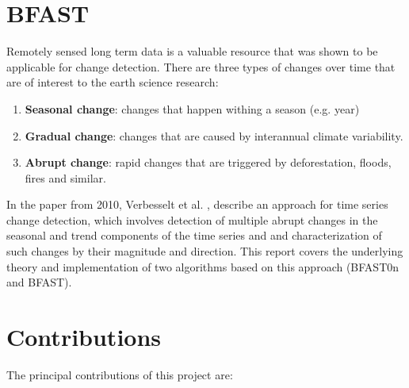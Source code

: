 \documentclass[main.tex]{subfiles}
\begin{document}
\section{BFAST}
\label{sec:changes}
Remotely sensed long term data is a valuable resource that was shown to be applicable for
change detection. There are three types of changes over time that are of
interest to the earth science research:
\begin{enumerate}
\item \textbf{Seasonal change}: changes that happen withing a season (e.g. year)
\item \textbf{Gradual change}: changes that are caused by interannual climate
  variability.
\item \textbf{Abrupt change}: rapid changes that are triggered by deforestation,
  floods, fires and similar.
\end{enumerate}
In the paper from 2010, Verbesselt et al. \cite{bfast}, describe an approach for
time series change detection, which involves
detection of multiple abrupt changes in the seasonal and trend components of the time series and
and characterization of such changes by their magnitude and direction. This
report covers the underlying theory and implementation of two algorithms based
on this approach (BFAST0n and BFAST).

\section{Contributions}
\label{sec:contributions}
The principal contributions of this project are: 
\end{document}
